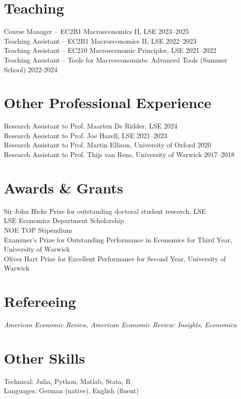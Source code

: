\documentclass[10pt,a4paper]{article}
\newcommand{\cvitem}[2]{%
  #1 \hfill #2\\ [0.2em]
}
\newcommand{\awarditem}[1]{%
  #1 \\ [0.2em]
}
\begin{document}
\vspace{-0.5em}
\section{Teaching}
\cvitem{Course Manager -- EC2B1 Macroeconomics II, LSE}{2023--2025}
\cvitem{Teaching Assistant -- EC2B1 Macroeconomics II, LSE}{2022--2023}
\cvitem{Teaching Assistant -- EC210 Macroeconomic Principles, LSE}{2021--2022}
\cvitem{Teaching Assistant -- Tools for Macroeconomists: Advanced Tools (Summer School)}{2022-2024}

\vspace{-0.5em}
\section{Other Professional Experience}
\cvitem{Research Assistant to Prof. Maarten De Ridder, LSE}{2024}
\cvitem{Research Assistant to Prof. Joe Hazell, LSE}{2021--2023}
\cvitem{Research Assistant to Prof. Martin Ellison, University of Oxford}{2020}
\cvitem{Research Assistant to Prof. Thijs van Rens, University of Warwick}{2017--2018}

\vspace{-0.5em}
\section{Awards \& Grants}
\awarditem{Sir John Hicks Prize for outstanding doctoral student research, LSE}
\awarditem{LSE Economics Department Scholarship}
\awarditem{NOE TOP Stipendium}
\awarditem{Examiner's Prize for Outstanding Performance in Economics for Third Year, University of Warwick}
\awarditem{Oliver Hart Prize for Excellent Performance for Second Year, University of Warwick}

\vspace{-0.5em}
\section{Refereeing}
\textit{American Economic Review}, \textit{American Economic Review: Insights}, \textit{Economica}

\vspace{-0.5em}
\section{Other Skills}
\awarditem{Technical: Julia, Python, Matlab, Stata, R}
\awarditem{Languages: German (native), English (fluent)}
\end{document}
